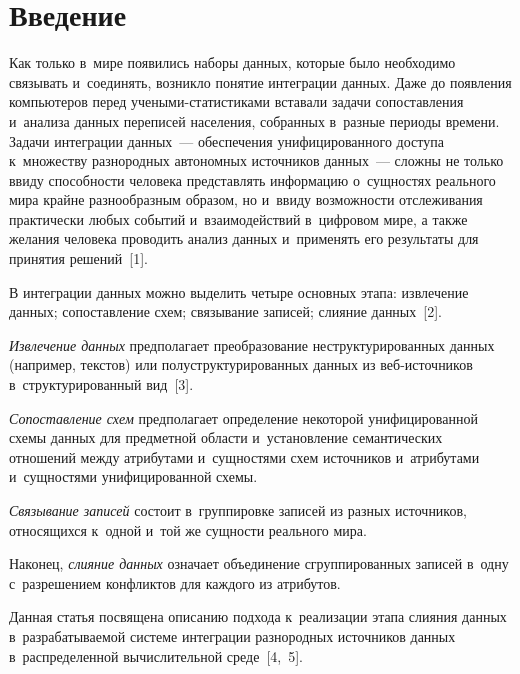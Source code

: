 
\thispagestyle{headings}

\begin{multicols}{2}

\label{st\stat}

\section{Введение}

    Как только в~мире появились наборы данных, которые было необходимо 
связывать и~соединять, возникло понятие интеграции данных. Даже до 
появления компьютеров перед уче\-ны\-ми-ста\-ти\-сти\-ка\-ми вставали задачи 
сопоставления и~анализа данных переписей населения, собранных в~разные\linebreak 
периоды времени. Задачи интеграции данных~--- обеспечения 
унифицированного доступа к~множеству разнородных автономных 
источников данных~--- сложны не только ввиду способности \mbox{человека} 
представлять информацию о~сущностях реального мира крайне 
разнообразным образом, но и~ввиду возможности отслеживания практически 
любых событий и~взаимодействий в~цифровом мире, а также желания 
человека проводить анализ данных и~применять его результаты для принятия 
решений~[1]. 
    
    В интеграции данных можно выделить четыре основных этапа: 
извлечение данных; сопоставление схем; связывание записей; слияние 
данных~[2].

 \textit{Извлечение данных} предполагает \mbox{преобразование} 
неструктурированных данных (например, текстов) или 
полуструктурированных данных из веб-ис\-точ\-ни\-ков 
в~структурированный вид~[3]. 

\textit{Сопоставление схем} предполагает 
определение некоторой унифицированной схемы данных для предметной 
об\-ласти и~установление семантических отношений меж\-ду атрибутами 
и~сущностями схем источников и~атрибутами и~сущностями 
унифицированной схемы. 

\textit{Связывание записей} со\-сто\-ит в~группировке 
записей из разных источников, относящихся к~одной и~той же сущ\-ности 
реального мира.

 Наконец, \textit{слияние данных} означает объединение 
сгруппированных записей в~одну с~разрешением конфликтов для каж\-до\-го из 
атрибутов.
    
    Данная статья посвящена описанию подхода к~реализации этапа слияния 
данных в~раз\-ра\-ба\-ты\-ва\-емой сис\-те\-ме интеграции разнородных источников 
данных в~рас\-пре\-де\-лен\-ной вы\-чис\-ли\-тель\-ной сре\-де~[4,~5]. 


\end{multicols}
